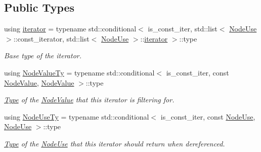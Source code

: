 \subsection*{Public Types}
\begin{DoxyCompactItemize}
\item 
\mbox{\label{classglow_1_1_node_value_iterator_impl_a7bd4a74736e858846d2884bbb06b2862}} 
using \hyperlink{classglow_1_1_node_value_iterator_impl_a7bd4a74736e858846d2884bbb06b2862}{iterator} = typename std\+::conditional$<$ is\+\_\+const\+\_\+iter, std\+::list$<$ \hyperlink{structglow_1_1_node_use}{Node\+Use} $>$\+::const\+\_\+iterator, std\+::list$<$ \hyperlink{structglow_1_1_node_use}{Node\+Use} $>$\+::\hyperlink{classglow_1_1_node_value_iterator_impl_a7bd4a74736e858846d2884bbb06b2862}{iterator} $>$\+::type
\begin{DoxyCompactList}\small\item\em Base type of the iterator. \end{DoxyCompactList}\item 
\mbox{\label{classglow_1_1_node_value_iterator_impl_ae219906549ad90e5c4bd3f5424767070}} 
using \hyperlink{classglow_1_1_node_value_iterator_impl_ae219906549ad90e5c4bd3f5424767070}{Node\+Value\+Ty} = typename std\+::conditional$<$ is\+\_\+const\+\_\+iter, const \hyperlink{structglow_1_1_node_value}{Node\+Value}, \hyperlink{structglow_1_1_node_value}{Node\+Value} $>$\+::type
\begin{DoxyCompactList}\small\item\em \hyperlink{structglow_1_1_type}{Type} of the \hyperlink{structglow_1_1_node_value}{Node\+Value} that this iterator is filtering for. \end{DoxyCompactList}\item 
\mbox{\label{classglow_1_1_node_value_iterator_impl_a188009c2b4658372cf779a20bb9ace75}} 
using \hyperlink{classglow_1_1_node_value_iterator_impl_a188009c2b4658372cf779a20bb9ace75}{Node\+Use\+Ty} = typename std\+::conditional$<$ is\+\_\+const\+\_\+iter, const \hyperlink{structglow_1_1_node_use}{Node\+Use}, \hyperlink{structglow_1_1_node_use}{Node\+Use} $>$\+::type
\begin{DoxyCompactList}\small\item\em \hyperlink{structglow_1_1_type}{Type} of the \hyperlink{structglow_1_1_node_use}{Node\+Use} that this iterator should return when dereferenced. \end{DoxyCompactList}\end{DoxyCompactItemize}
